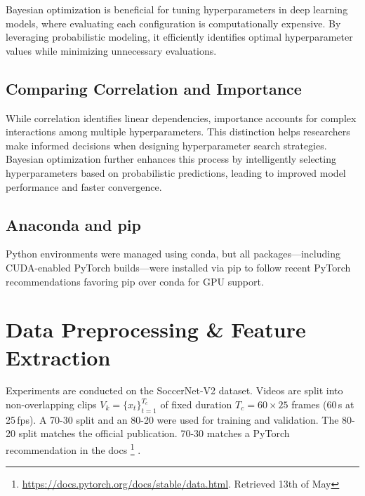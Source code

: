 Bayesian optimization is beneficial for tuning hyperparameters in deep learning models, where evaluating each configuration is computationally expensive. By leveraging probabilistic modeling, it efficiently identifies optimal hyperparameter values while minimizing unnecessary evaluations.

\subsection{Comparing Correlation and Importance}

While correlation identifies linear dependencies, importance accounts for complex interactions among multiple hyperparameters. This distinction helps researchers make informed decisions when designing hyperparameter search strategies. Bayesian optimization further enhances this process by intelligently selecting hyperparameters based on probabilistic predictions, leading to improved model performance and faster convergence.

\subsection{Anaconda and pip}
\label{ssec:conda_pip}
Python environments were managed using conda, but all packages—including CUDA-enabled PyTorch builds—were installed via pip to follow recent PyTorch recommendations favoring pip over conda for GPU support.

\section{Data Preprocessing \& Feature Extraction}
\label{sec:preprocessing}

Experiments are conducted on the SoccerNet-V2 dataset\cite{deliege_soccernet-v2_dataset_2021}. Videos are split into non-overlapping clips $V_k=\{x_t\}_{t=1}^{T_c}$ of fixed duration $T_c=60\!\times\!25$ frames (60\,s at 25\,fps). A 70-30 split and an 80-20 were used for training and validation. The 80-20 split matches the official publication. 70-30 matches a PyTorch recommendation in the docs
\footnote{
\url{https://docs.pytorch.org/docs/stable/data.html}. 
Retrieved 13th of May}
.





